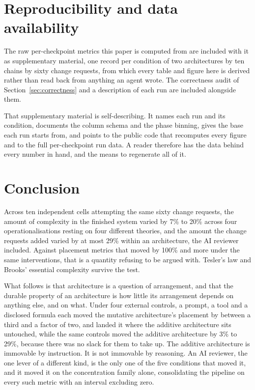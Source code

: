 \documentclass[11pt,a4paper]{article}
\begin{document}
\section{Reproducibility and data availability}
\label{sec:repro}

The raw per-checkpoint metrics this paper is computed from are included with it as
supplementary material, one record per condition of two architectures by ten
chains by sixty change requests, from which every table and figure here is
derived rather than read back from anything an agent wrote. The correctness audit
of Section~\ref{sec:correctness} and a description of each run are included
alongside them.

That supplementary material is self-describing. It names each run and its
condition, documents the column schema and the phase binning, gives the base each
run starts from, and points to the public code that recomputes every figure and
to the full per-checkpoint run data. A reader therefore has the data behind every
number in hand, and the means to regenerate all of it.

\section{Conclusion}

Across ten independent cells attempting the same sixty change requests, the
amount of complexity in the finished system varied by 7\% to 20\% across four
operationalisations resting on four different theories, and the amount the change
requests added varied by at most 29\% within an architecture, the AI reviewer
included. Against placement metrics that moved by 100\% and more under the same
interventions, that is a quantity refusing to be argued with. Tesler's law and
Brooks' essential complexity survive the test.

What follows is that architecture is a question of arrangement, and that the
durable property of an architecture is how little its arrangement depends on
anything else, and on what. Under four external controls, a prompt, a tool and a
disclosed formula each moved the mutative architecture's placement by between a
third and a factor of two, and landed it where the additive architecture sits
untouched, while the same controls moved the additive architecture by 3\% to
29\%, because there was no slack for them to take up. The additive architecture
is immovable by instruction. It is not immovable by reasoning. An AI reviewer,
the one lever of a different kind, is the only one of the five conditions that
moved it, and it moved it on the concentration family alone, consolidating the
pipeline on every such metric with an interval excluding zero.
\end{document}
